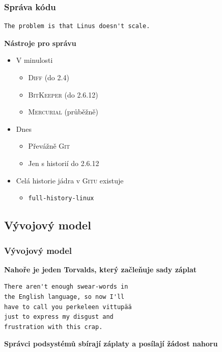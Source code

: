 \documentclass[xcolor=dvipsnames,handout]{beamer}
\newcommand{\heading}[1]{\textbf{\textcolor{BurntOrange}{#1}}}
\begin{document}
\begin{frame}[fragile]
  \frametitle{Správa kódu}

  \begin{verbatim}
The problem is that Linus doesn't scale.
\end{verbatim}

  \bigskip
  \pause

  \heading{Nástroje pro správu}
  \begin{itemize}
    \item V minulosti
    \begin{itemize}
      \item \textsc{Diff} (do 2.4)
      \item \textsc{BitKeeper} (do 2.6.12)
      \item \textsc{Mercurial} (průběžně)
    \end{itemize}

    \pause

    \item Dnes
    \begin{itemize}
      \item Převážně \textsc{Git}
      \item Jen s historií do 2.6.12
    \end{itemize}

    \pause

    \item Celá historie jádra v \textsc{Gitu} existuje
    \begin{itemize}
      \item \nolinkurl{full-history-linux}
    \end{itemize}
  \end{itemize}

\end{frame}

\subsection{Vývojový model}

\begin{frame}[fragile]
  \frametitle{Vývojový model}

  \heading{Nahoře je jeden Torvalds, který začleňuje sady záplat}
\begin{verbatim}
There aren't enough swear-words in
the English language, so now I'll
have to call you perkeleen vittupää
just to express my disgust and
frustration with this crap.
\end{verbatim}

  \pause
  \bigskip

  \heading{Správci podsystémů sbírají záplaty a posílají žádost nahoru}

\end{frame}
\end{document}
